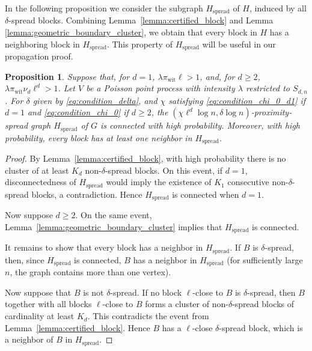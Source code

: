 \documentclass[11pt, a4paper]{amsart}
\newcommand{\1}{\mathbf{1}}
\newtheorem{proposition}[theorem]{Proposition}
\theoremstyle{definition}
\theoremstyle{remark}
\theoremstyle{definition}
\begin{document}
In the following proposition we consider the subgraph $H_{\mathrm{spread}}$ of $H$, induced by all $\delta$-spread blocks. Combining Lemma~\ref{lemma:certified_block} and Lemma \ref{lemma:geometric_boundary_cluster}, we  obtain that every block in $H$ has a neighboring block in $H_{\mathrm{spread}}$. This property of $H_{\mathrm{spread}}$ will be useful in our propagation proof. 


\begin{proposition}
\label{prop:connectivity}
Suppose that, for \(d=1\),
\(\lambda \pi_{\mathrm{wit}}\ell>1\), and, for \(d\geq2\),
\(\lambda\pi_{\mathrm{wit}}\nu_d\ell^d>1\). Let \(V\) be a Poisson point
process with intensity \(\lambda\) restricted to \(S_{d,n}\). For
\(\delta\) given by \eqref{eq:condition_delta}, and \(\chi\) satisfying
\eqref{eq:condition_chi_0_d1} if \(d=1\) and
\eqref{eq:condition_chi_0} if \(d\geq2\), the
\((\chi\ell^d\log n,\delta\log n)\)-proximity-spread graph
\(H_{\mathrm{spread}}\) of \(G\) is connected with high probability.
Moreover, with high probability, every block has at least one neighbor in
\(H_{\mathrm{spread}}\).
\end{proposition}

\begin{proof}
By Lemma~\ref{lemma:certified_block}, with high probability there is no
cluster of at least \(K_d\) non-\(\delta\)-spread blocks. On this event,
if \(d=1\), disconnectedness of \(H_{\mathrm{spread}}\) would imply the
existence of \(K_1\) consecutive non-\(\delta\)-spread blocks, a contradiction.
Hence \(H_{\mathrm{spread}}\) is connected when \(d=1\).

Now suppose \(d\geq 2\). On the same event,
Lemma~\ref{lemma:geometric_boundary_cluster} implies that
\(H_{\mathrm{spread}}\) is connected.

It remains to show that every block has a neighbor in
\(H_{\mathrm{spread}}\). If \(B\) is \(\delta\)-spread, then, since
\(H_{\mathrm{spread}}\) is connected, \(B\) has a neighbor in
\(H_{\mathrm{spread}}\) (for sufficiently large \(n\), the graph contains
more than one vertex).

Now suppose that \(B\) is not \(\delta\)-spread. If no block $\ell$-close to \(B\) is \(\delta\)-spread, then \(B\) together with all blocks
$\ell$-close to \(B\) forms a cluster of non-\(\delta\)-spread blocks
of cardinality at least \(K_d\). This contradicts the event from
Lemma~\ref{lemma:certified_block}. Hence \(B\) has a  $\ell$-close
\(\delta\)-spread block, which is a neighbor of \(B\) in
\(H_{\mathrm{spread}}\).
\end{proof}
\end{document}
